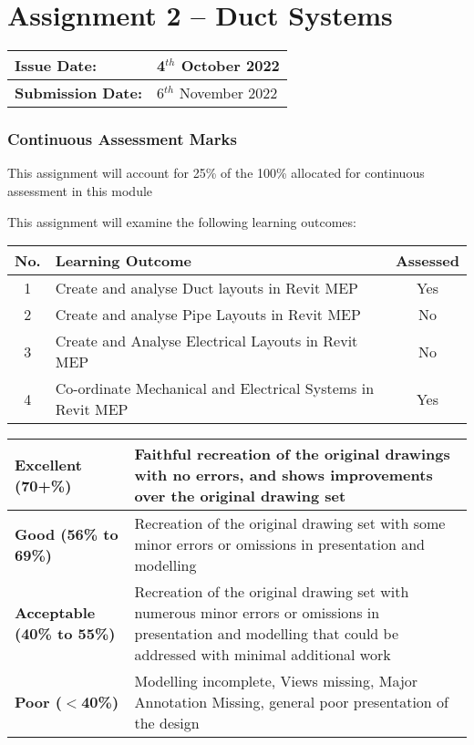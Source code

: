 
	
\part*{Assignment 2 – Duct Systems}

\begin{tabularx}{\textwidth}{ |X|X| }
	\hline
	\textbf{Issue Date:} & 4$^{th}$ October 2022 \\
	\hline 
	\textbf{Submission Date:}  & 6$^{th}$ November 2022  \\
	\hline
\end{tabularx}


\section*{Continuous Assessment Marks}
This assignment will account for 25\% of the 100\% allocated for continuous assessment in this module

This assignment will examine the following learning outcomes:\\

\begin{tabularx}{\textwidth}{ |c|X|c| }
	\hline
	\textbf{No.} & \textbf{Learning Outcome} & \textbf{Assessed} \\
	\hline 
	1  & Create and analyse Duct layouts in Revit MEP & Yes \\
	2  & Create and analyse Pipe Layouts in Revit MEP & No \\
	3  & Create and Analyse Electrical Layouts in Revit MEP & No \\
	4  & Co-ordinate Mechanical and Electrical Systems in Revit MEP & Yes \\
	\hline
\end{tabularx}

\vspace{1cm}

\begin{tabularx}{\textwidth}{ |l|X| }
	\hline 
	\textbf{Excellent (70+\%)} & Faithful recreation of the original drawings with no errors, and shows improvements over the original drawing set\\ 
	\hline
	\textbf{Good (56\% to 69\%)} & Recreation of the original drawing set with some minor errors or omissions in presentation and modelling \\
	\hline
	\textbf{Acceptable (40\% to 55\%)} & Recreation of the original drawing set with numerous minor errors or omissions in presentation and modelling that could be addressed with minimal additional work \\ 
	\hline
	\textbf{Poor ($<$40\%)} & Modelling incomplete, Views missing, Major Annotation Missing, general poor presentation of the design  \\
	\hline
\end{tabularx}

